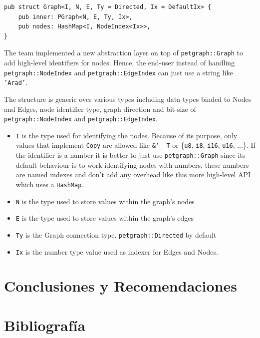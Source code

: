 \begin{verbatim}
pub struct Graph<I, N, E, Ty = Directed, Ix = DefaultIx> {
    pub inner: PGraph<N, E, Ty, Ix>,
    pub nodes: HashMap<I, NodeIndex<Ix>>,
}
\end{verbatim}

The team implemented a new abstraction layer on top of \texttt{petgraph::Graph} to add high-level identifiers for nodes.
Hence, the end-user instead of handling \texttt{petgraph::NodeIndex} and \texttt{petgraph::EdgeIndex} can just use a string like \texttt{'Arad'}.

The structure is generic over various types including data types binded to Nodes and Edges, node identifier type, graph direction and bit-size of
\texttt{petgraph::NodeIndex} and \texttt{petgraph::EdgeIndex}.

\begin{itemize}
 \item \texttt{I} is the type used for identifying the nodes. Because of its purpose, only values that implement
 \texttt{Copy} are allowed like \texttt{\&'\_ T} or \{\texttt{u8}, \texttt{i8}, \texttt{i16}, \texttt{u16}, ...\}. 
 If the identifier is a number it is better to just use \texttt{petgraph::Graph} since its default
 behaviour is to work identifying nodes with numbers, these numbers are named indexes and don't add any overhead
 like this more high-level API which uses a \texttt{HashMap}.
 \item \texttt{N} is the type used to store values within the graph's nodes
 \item \texttt{E} is the type used to store values within the graph's edges
 \item \texttt{Ty} is the Graph connection type. \texttt{petgraph::Directed} by default
 \item \texttt{Ix} is the number type value used as indexer for Edges and Nodes.
\end{itemize}


\newpage
\section{Conclusiones y Recomendaciones}


\newpage
\section{Bibliografía}
\printbibliography[heading=none]

\newpage
\appendix

